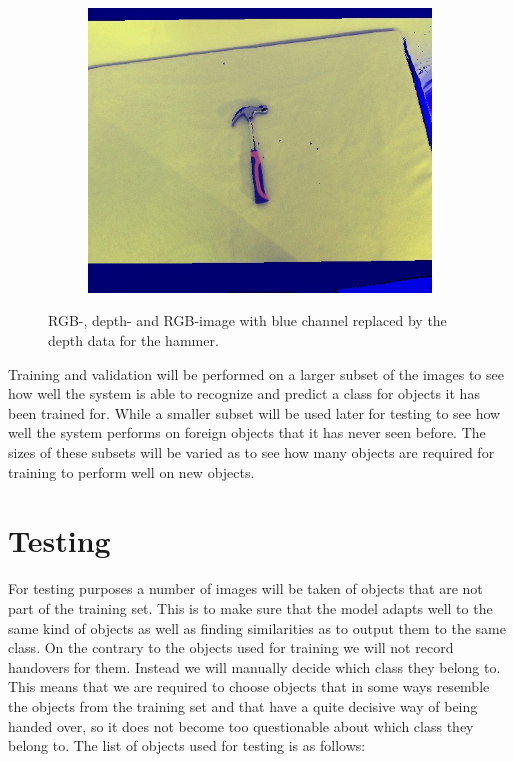 \begin{figure}
\begin{subfigure}[b]{0.3\textwidth}
		\includegraphics[width=\textwidth]{img/methods/rgbd/rgbd.jpg}
	\end{subfigure}
	\caption{RGB-, depth- and RGB-image with blue channel replaced by the depth data for the hammer.}
	\label{fig:rgbd}
\end{figure}

Training and validation will be performed on a larger subset of the images to see how well the system is able to recognize and predict a class for objects it has been trained for. While a smaller subset will be used later for testing to see how well the system performs on foreign objects that it has never seen before. The sizes of these subsets will be varied as to see how many objects are required for training to perform well on new objects.


\section{Testing}
\label{sec:testing}

For testing purposes a number of images will be taken of objects that are not part of the training set. This is to make sure that the model adapts well to the same kind of objects as well as finding similarities as to output them to the same class. On the contrary to the objects used for training we will not record handovers for them. Instead we will manually decide which class they belong to. This means that we are required to choose objects that in some ways resemble the objects from the training set and that have a quite decisive way of being handed over, so it does not become too questionable about which class they belong to. The list of objects used for testing is as follows:

